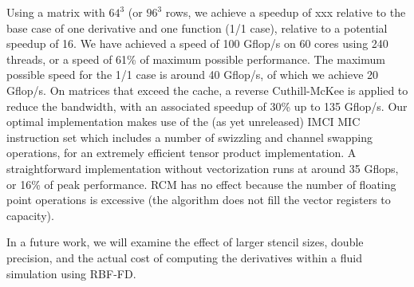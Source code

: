 \documentclass[10pt,conference,compsocconf]{IEEEtran}
\newcommand{\todo}[1]{{\color{red}\textbf{\hl{#1}}\xspace}}
\begin{document}
Using a matrix with $64^3$ (or $96^3$ rows, we achieve a speedup of
xxx relative to the base case of one derivative and one function (1/1
case), relative to a potential speedup of 16. We have achieved a
speed of 100 Gflop/s on 60 cores using 240 threads, or a speed of 61\% of
maximum possible performance. The maximum possible speed for the 1/1
case is around 40 Gflop/s, of which we achieve 20 Gflop/s. On matrices
that exceed the cache, a reverse Cuthill-McKee is applied to reduce the
bandwidth, with an associated speedup of 30\% up to 135 Gflop/s. Our
optimal implementation makes use of the (as yet unreleased) IMCI MIC instruction set 
which includes a number of swizzling and channel swapping operations, for an
extremely efficient tensor product implementation. A straightforward
implementation without vectorization runs at around 35 Gflops, or 16\% of peak
performance. RCM has no effect because the number of floating point
operations is excessive (the algorithm does not fill the vector
registers to capacity).

In a future work, we will examine the effect of larger stencil sizes,
double precision, and the actual cost of computing the derivatives
within a fluid simulation using RBF-FD.
\end{document}
